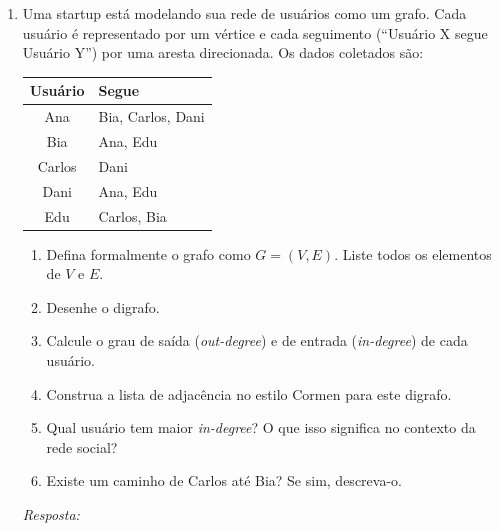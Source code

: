 \documentclass[12pt]{article}
\newcommand{\quadro}[1]{\vspace{0.2cm}\begin{tcolorbox}[colback=white, colframe=black, height=#1, boxrule=0.5pt, arc=0pt] \textit{Resposta:} \end{tcolorbox}}
\begin{document}
\begin{enumerate}[label=\arabic*), leftmargin=1.5cm, itemsep=0.8cm]
\begin{enumerate}[label=\alph*)]
    \item A matriz é simétrica? O grafo é direcionado ou não direcionado? Justifique.
    \item Liste o conjunto de arestas $E$ com base na matriz.
    \item Converta para a Lista de Adjacência (estilo Cormen).
    \item Desenhe o digrafo. Existe algum ciclo no grafo? Se sim, descreva-o.
    \item Qual vértice tem grau de saída (\textit{out-degree}) zero? O que isso significa?
\end{enumerate}
\quadro{6cm}

\item Uma startup está modelando sua rede de usuários como um grafo. Cada usuário é representado por um vértice e cada seguimento (``Usuário X segue Usuário Y'') por uma aresta direcionada. Os dados coletados são:

\begin{center}
    \begin{tabular}{|c|l|}
        \hline
        \textbf{Usuário} & \textbf{Segue} \\ \hline
        Ana   & Bia, Carlos, Dani \\ \hline
        Bia   & Ana, Edu          \\ \hline
        Carlos & Dani              \\ \hline
        Dani  & Ana, Edu          \\ \hline
        Edu   & Carlos, Bia       \\ \hline
    \end{tabular}
\end{center}

\begin{enumerate}[label=\alph*)]
    \item Defina formalmente o grafo como $G = (V, E)$. Liste todos os elementos de $V$ e $E$.
    \item Desenhe o digrafo.
    \item Calcule o grau de saída (\textit{out-degree}) e de entrada (\textit{in-degree}) de cada usuário.
    \item Construa a lista de adjacência no estilo Cormen para este digrafo.
    \item Qual usuário tem maior \textit{in-degree}? O que isso significa no contexto da rede social?
    \item Existe um caminho de Carlos até Bia? Se sim, descreva-o.
\end{enumerate} 
\begin{center}
\end{center}
\quadro{10cm}

\end{enumerate}
\end{document}
